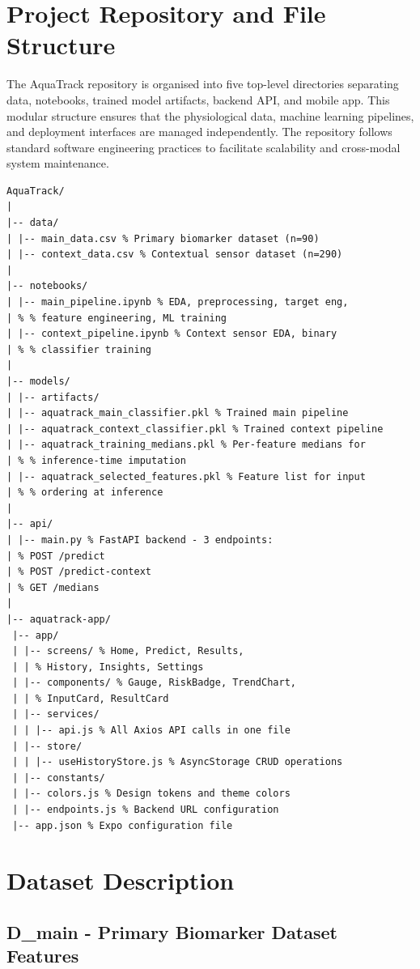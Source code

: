 \chapter{Project Repository and File Structure}

The AquaTrack repository is organised into five top-level directories separating data, notebooks, trained model artifacts, backend API, and mobile app. This modular structure ensures that the physiological data, machine learning pipelines, and deployment interfaces are managed independently. The repository follows standard software engineering practices to facilitate scalability and cross-modal system maintenance.

\begin{lstlisting}[basicstyle=\ttfamily\small]
AquaTrack/ 
| 
|-- data/ 
| |-- main_data.csv % Primary biomarker dataset (n=90) 
| |-- context_data.csv % Contextual sensor dataset (n=290) 
| 
|-- notebooks/ 
| |-- main_pipeline.ipynb % EDA, preprocessing, target eng, 
| % % feature engineering, ML training 
| |-- context_pipeline.ipynb % Context sensor EDA, binary 
| % % classifier training 
| 
|-- models/ 
| |-- artifacts/ 
| |-- aquatrack_main_classifier.pkl % Trained main pipeline 
| |-- aquatrack_context_classifier.pkl % Trained context pipeline 
| |-- aquatrack_training_medians.pkl % Per-feature medians for 
| % % inference-time imputation 
| |-- aquatrack_selected_features.pkl % Feature list for input 
| % % ordering at inference 
| 
|-- api/ 
| |-- main.py % FastAPI backend - 3 endpoints: 
| % POST /predict 
| % POST /predict-context 
| % GET /medians 
| 
|-- aquatrack-app/ 
 |-- app/ 
 | |-- screens/ % Home, Predict, Results, 
 | | % History, Insights, Settings 
 | |-- components/ % Gauge, RiskBadge, TrendChart, 
 | | % InputCard, ResultCard 
 | |-- services/ 
 | | |-- api.js % All Axios API calls in one file 
 | |-- store/ 
 | | |-- useHistoryStore.js % AsyncStorage CRUD operations 
 | |-- constants/ 
 | |-- colors.js % Design tokens and theme colors 
 | |-- endpoints.js % Backend URL configuration 
 |-- app.json % Expo configuration file
\end{lstlisting}

\chapter{Dataset Description}

\section{D\_main - Primary Biomarker Dataset Features}

